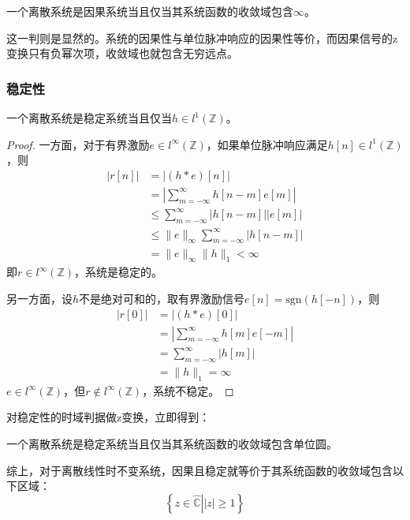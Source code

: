 \begin{proposition}[因果性的z域判则]\label{prop:causal_z}
    一个离散系统是因果系统当且仅当其系统函数的收敛域包含$\infty$。
\end{proposition}

这一判则是显然的。系统的因果性与单位脉冲响应的因果性等价，而因果信号的z变换只有负幂次项，收敛域也就包含无穷远点。

\subsubsection{稳定性}

\begin{proposition}[稳定性的时域判则]
    一个离散系统是稳定系统当且仅当$h\in l^1(\mathbb{Z})$。
\end{proposition}
\begin{proof}
    一方面，对于有界激励$e\in l^{\infty}(\mathbb{Z})$，如果单位脉冲响应满足$h[n]\in l^1(\mathbb{Z})$，则
    \begin{align*}
        |r[n]|&=|(h*e)[n]|\\
        &=\left|\sum_{m=-\infty}^{\infty}h[n-m]e[m]\right|\\
        &\leq \sum_{m=-\infty}^{\infty}|h[n-m]||e[m]|\\
        &\leq \|e\|_{\infty}\sum_{m=-\infty}^{\infty}|h[n-m]|\\
        &=\|e\|_{\infty}\|h\|_1<\infty
    \end{align*}
    即$r\in l^{\infty}(\mathbb{Z})$，系统是稳定的。
    
    另一方面，设$h$不是绝对可和的，取有界激励信号$e[n]=\text{sgn}(h[-n])$，则
    \begin{align*}
        |r[0]|&=|(h*e)[0]|\\
        &=\left|\sum_{m=-\infty}^{\infty}h[m]e[-m]\right|\\
        &=\sum_{m=-\infty}^{\infty}|h[m]|\\
        &=\|h\|_1=\infty
    \end{align*}
    $e\in l^{\infty}(\mathbb{Z})$，但$r\notin l^{\infty}(\mathbb{Z})$，系统不稳定。
\end{proof}

对稳定性的时域判据做z变换，立即得到：

\begin{proposition}[稳定性的z域判则]\label{prop:stability_z}
    一个离散系统是稳定系统当且仅当其系统函数的收敛域包含单位圆。
\end{proposition}

综上，对于离散线性时不变系统，因果且稳定就等价于其系统函数的收敛域包含以下区域：
\[\left\{\left.z\in\hat{\mathbb{C}}\right||z|\geq 1\right\}\]
